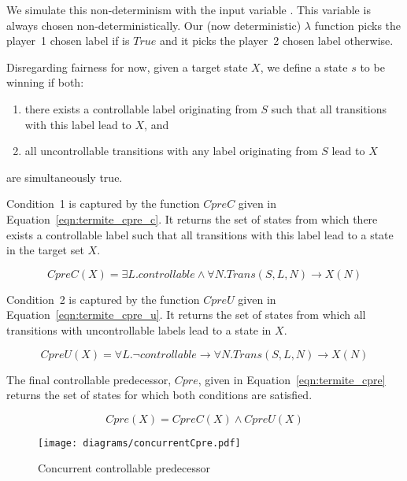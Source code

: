 We simulate this non-determinism with the input variable . This variable is always chosen non-deterministically. Our (now deterministic) $\lambda$ function picks the player~1 chosen label if  is $True$ and it picks the player~2 chosen label otherwise.

Disregarding fairness for now, given a target state $X$, we define a state $s$ to be winning if both:
\begin{enumerate}
    \item there exists a controllable label originating from $S$ such that all transitions with this label lead to $X$, and
    \item all uncontrollable transitions with any label originating from $S$ lead to $X$
\end{enumerate}
\noindent are simultaneously true. 

Condition~1 is captured by the function $CpreC$ given in Equation~\ref{eqn:termite_cpre_c}. It returns the set of states from which there exists a controllable label such that all transitions with this label lead to a state in the target set $X$.

\begin{equation}
    CpreC(X) =  \exists L. controllable \land \forall N. Trans(S, L, N) \rightarrow X(N)
    \label{eqn:termite_cpre_c}
\end{equation}

Condition~2 is captured by the function $CpreU$ given in Equation~\ref{eqn:termite_cpre_u}. It returns the set of states from which all transitions with uncontrollable labels lead to a state in $X$.

\begin{equation}
    CpreU(X) =  \forall L. \neg controllable \rightarrow \forall N. Trans(S, L, N) \rightarrow X(N)
    \label{eqn:termite_cpre_u}
\end{equation}

The final controllable predecessor, $Cpre$, given in Equation~\ref{eqn:termite_cpre} returns the set of states for which both conditions are satisfied.

\begin{equation}
    Cpre(X) =  CpreC(X) \land CpreU(X)
    \label{eqn:termite_cpre}
\end{equation}

\begin{figure}[t]
\centering
\texttt{[image: diagrams/concurrentCpre.pdf]}
\caption{Concurrent controllable predecessor}
\label{fig:concurrent_cpre}
\end{figure}

